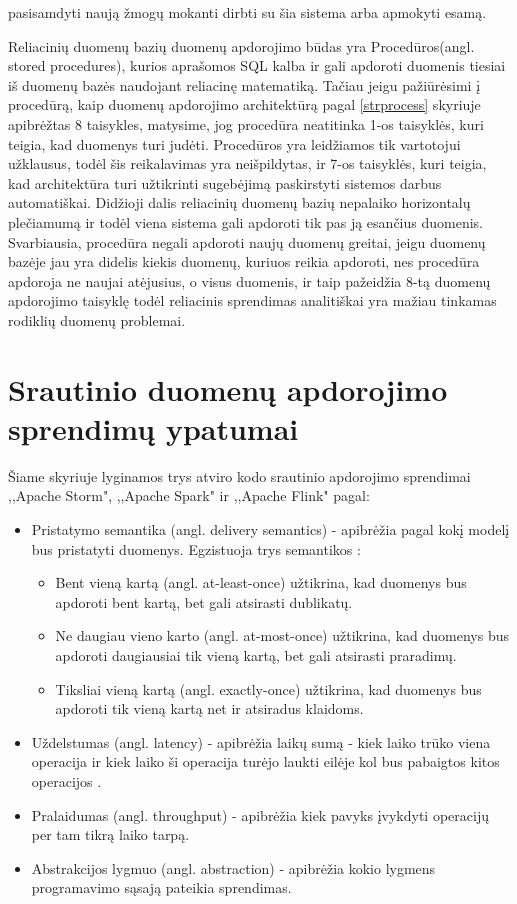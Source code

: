 \documentclass{VUMIFPSkursinis}
\begin{document}
    pasisamdyti naują žmogų mokanti dirbti su šia sistema arba apmokyti esamą. \par
        Reliacinių duomenų bazių duomenų apdorojimo būdas yra Procedūros(angl. stored procedures), kurios aprašomos SQL kalba ir gali apdoroti duomenis tiesiai iš duomenų bazės 
    naudojant reliacinę matematiką. Tačiau jeigu pažiūrėsimi į procedūrą, kaip duomenų apdorojimo architektūrą pagal \ref{strprocess} skyriuje apibrėžtas 8 taisykles, 
    matysime, jog procedūra neatitinka 1-os taisyklės, kuri teigia, kad duomenys turi judėti. Procedūros yra leidžiamos tik vartotojui užklausus, todėl šis reikalavimas yra neišpildytas, 
    ir 7-os taisyklės, kuri teigia, kad architektūra turi užtikrinti sugebėjimą paskirstyti sistemos darbus automatiškai. Didžioji dalis reliacinių duomenų bazių nepalaiko horizontalų 
    plečiamumą \cite{cattelsql, jkubas} ir todėl viena sistema gali apdoroti tik pas ją esančius duomenis. Svarbiausia, procedūra negali apdoroti naujų duomenų greitai, jeigu duomenų bazėje 
    jau yra didelis kiekis duomenų, kuriuos reikia apdoroti, nes procedūra apdoroja ne naujai atėjusius, o visus duomenis, ir taip pažeidžia 8-tą duomenų apdorojimo taisyklę todėl reliacinis sprendimas
    analitiškai yra mažiau tinkamas rodiklių duomenų problemai.


\section{Srautinio duomenų apdorojimo sprendimų ypatumai} \label{srautarch}
Šiame skyriuje lyginamos trys atviro kodo srautinio apdorojimo sprendimai ,,Apache Storm", ,,Apache Spark" ir ,,Apache Flink" pagal:
\begin{itemize}
    \item Pristatymo semantika (angl. delivery semantics) - apibrėžia pagal kokį modelį bus pristatyti duomenys. Egzistuoja trys semantikos \cite{ensar20}: 
    \begin{itemize}
        \item Bent vieną kartą (angl. at-least-once) užtikrina, kad duomenys bus apdoroti bent kartą, bet gali atsirasti dublikatų. 
        \item Ne daugiau vieno karto (angl. at-most-once) užtikrina, kad duomenys bus apdoroti daugiausiai tik vieną kartą, bet gali atsirasti praradimų. 
        \item Tiksliai vieną kartą (angl. exactly-once) užtikrina, kad duomenys bus apdoroti tik vieną kartą net ir atsiradus klaidoms.
    \end{itemize}
    \item Uždelstumas (angl. latency) - apibrėžia laikų sumą - kiek laiko trūko viena operacija ir kiek laiko ši operacija turėjo laukti eilėje
    kol bus pabaigtos kitos operacijos \cite{karimov2018benchmarking}.
    \item Pralaidumas (angl. throughput) - apibrėžia kiek pavyks įvykdyti operacijų per tam tikrą laiko tarpą.
    \item Abstrakcijos lygmuo (angl. abstraction) - apibrėžia kokio lygmens programavimo sąsają pateikia sprendimas.
\end{itemize}
\end{document}

